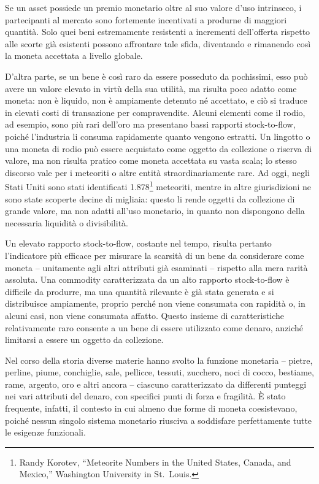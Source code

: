 \documentclass[
  a5paper,
  smalldemyvopaper,10pt,twoside,onecolumn,openright,extrafontsizes,hidelinks]{memoir}
\begin{document}
Se un asset possiede un premio monetario oltre al suo valore d'uso
intrinseco, i partecipanti al mercato sono fortemente incentivati a
produrne di maggiori quantità. Solo quei beni estremamente resistenti a
incrementi dell'offerta rispetto alle scorte già esistenti possono
affrontare tale sfida, diventando e rimanendo così la moneta accettata a
livello globale.

D'altra parte, se un bene è così raro da essere posseduto da pochissimi,
esso può avere un valore elevato in virtù della sua utilità, ma risulta
poco adatto come moneta: non è liquido, non è ampiamente detenuto né
accettato, e ciò si traduce in elevati costi di transazione per
compravendite. Alcuni elementi come il rodio, ad esempio, sono più rari
dell'oro ma presentano bassi rapporti stock-to-flow, poiché l'industria
li consuma rapidamente quanto vengono estratti. Un lingotto o una moneta
di rodio può essere acquistato come oggetto da collezione o riserva di
valore, ma non risulta pratico come moneta accettata su vasta scala; lo
stesso discorso vale per i meteoriti o altre entità straordinariamente
rare. Ad oggi, negli Stati Uniti sono stati identificati
1.878\footnote{Randy Korotev, ``Meteorite Numbers in the United States,
  Canada, and Mexico,'' Washington University in St.~Louis.} meteoriti,
mentre in altre giurisdizioni ne sono state scoperte decine di migliaia:
questo li rende oggetti da collezione di grande valore, ma non adatti
all'uso monetario, in quanto non dispongono della necessaria liquidità o
divisibilità.

Un elevato rapporto stock-to-flow, costante nel tempo, risulta pertanto
l'indicatore più efficace per misurare la scarsità di un bene da
considerare come moneta -- unitamente agli altri attributi già esaminati
-- rispetto alla mera rarità assoluta. Una commodity caratterizzata da
un alto rapporto stock-to-flow è difficile da produrre, ma una quantità
rilevante è già stata generata e si distribuisce ampiamente, proprio
perché non viene consumata con rapidità o, in alcuni casi, non viene
consumata affatto. Questo insieme di caratteristiche relativamente raro
consente a un bene di essere utilizzato come denaro, anziché limitarsi a
essere un oggetto da collezione.

Nel corso della storia diverse materie hanno svolto la funzione
monetaria -- pietre, perline, piume, conchiglie, sale, pellicce,
tessuti, zucchero, noci di cocco, bestiame, rame, argento, oro e altri
ancora -- ciascuno caratterizzato da differenti punteggi nei vari
attributi del denaro, con specifici punti di forza e fragilità. È stato
frequente, infatti, il contesto in cui almeno due forme di moneta
coesistevano, poiché nessun singolo sistema monetario riusciva a
soddisfare perfettamente tutte le esigenze funzionali.
\end{document}
